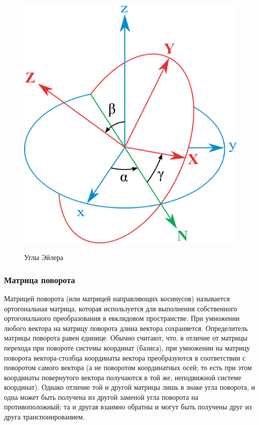 \begin{figure}[ht!]
\begin{center}
\includegraphics[scale=0.25]{./Rigidbody/Eulerangles.eps}  \\
\caption{Углы Эйлера}\label{Eulerangles}
\end{center}
\end{figure}

\subsubsection{Матрица поворота}
Матрицей поворота (или матрицей направляющих косинусов) называется ортогональная матрица,
которая используется для выполнения собственного ортогонального преобразования в евклидовом пространстве.
При умножении любого вектора на матрицу поворота длина вектора сохраняется. Определитель матрицы поворота равен единице.
Обычно считают, что, в отличие от матрицы перехода при повороте системы координат (базиса),
при умножении на матрицу поворота вектора-столбца координаты вектора преобразуются в соответствии с поворотом
самого вектора (а не поворотом координатных осей; то есть при этом координаты повернутого вектора получаются в той же,
неподвижной системе координат). Однако отличие той и другой матрицы лишь в знаке угла поворота,
и одна может быть получена из другой заменой угла поворота на противоположный; та и другая взаимно обратны и могут быть получены
друг из друга транспонированием.

